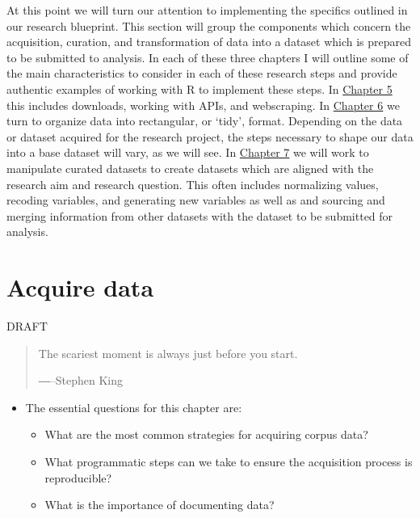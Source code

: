 \documentclass[
]{article}
\providecommand{\tightlist}{%
  \setlength{\itemsep}{0pt}\setlength{\parskip}{0pt}}
\newenvironment{rmdblock}[1]
  {\begin{shaded*}
  \begin{itemize}
  \renewcommand{\labelitemi}{
    \raisebox{-.5\height}[0pt][0pt]{
      {\setkeys{Gin}{width=2em,keepaspectratio}\texttt{[image: assets/images/\#1]}}
    }
  }
  \item
  }
  {
  \end{itemize}
  \end{shaded*}
  }
\newenvironment{rmdkey}
  {\begin{rmdblock}{key}}
  {\end{rmdblock}}
\begin{document}
At this point we will turn our attention to implementing the specifics outlined in our research blueprint. This section will group the components which concern the acquisition, curation, and transformation of data into a dataset which is prepared to be submitted to analysis. In each of these three chapters I will outline some of the main characteristics to consider in each of these research steps and provide authentic examples of working with R to implement these steps. In \protect\hyperlink{acquire-data}{Chapter 5} this includes downloads, working with APIs, and webscraping. In \protect\hyperlink{curate-data}{Chapter 6} we turn to organize data into rectangular, or `tidy', format. Depending on the data or dataset acquired for the research project, the steps necessary to shape our data into a base dataset will vary, as we will see. In \protect\hyperlink{transform-data}{Chapter 7} we will work to manipulate curated datasets to create datasets which are aligned with the research aim and research question. This often includes normalizing values, recoding variables, and generating new variables as well as and sourcing and merging information from other datasets with the dataset to be submitted for analysis.

\hypertarget{acquire-data}{%
\section{Acquire data}\label{acquire-data}}

DRAFT

\begin{quote}
The scariest moment is always just before you start.

―--Stephen King
\end{quote}

\begin{rmdkey}
The essential questions for this chapter are:

\begin{itemize}
\tightlist
\item
  What are the most common strategies for acquiring corpus data?
\item
  What programmatic steps can we take to ensure the acquisition process
  is reproducible?
\item
  What is the importance of documenting data?
\end{itemize}
\end{rmdkey}
\end{document}
